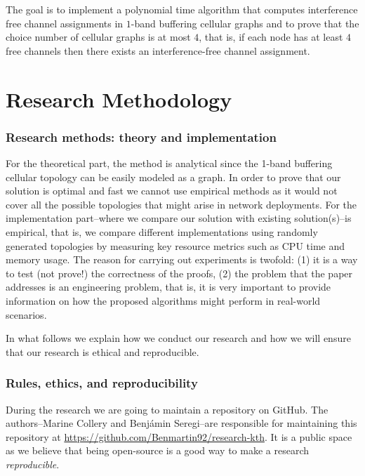 \documentclass[letterpaper, 10 pt, conference]{ieeeconf}  %
\begin{document}
The goal is to implement a polynomial time algorithm that computes interference free channel assignments in $1$-band buffering cellular graphs and to prove that the choice number of cellular graphs is at most $4$, that is, if each node has at least $4$ free channels then there exists an interference-free channel assignment.

\section{Research Methodology}
\subsubsection*{Research methods: theory and implementation}
For the theoretical part, the method is analytical since the 1-band buffering cellular topology can be easily modeled as a graph. In order
to prove that our solution is optimal and fast we cannot use empirical methods as it would not cover all the possible
topologies that might arise in network deployments. For the implementation part\---where we compare our solution with existing solution(s)\---is empirical, that is, we compare different implementations using randomly generated topologies by measuring key resource metrics such as CPU time and memory usage. The reason for carrying out experiments is twofold: (1) it is a way to test (not prove!) the correctness of the proofs, (2) the problem that the paper addresses is an engineering problem, that is, it is very important to provide information on how the proposed algorithms might perform in real-world scenarios.

In what follows we explain how we conduct our research and how we will ensure that our research is ethical and reproducible.
\subsubsection*{Rules, ethics, and reproducibility}
During the research we are going to maintain a repository on GitHub. The authors\---Marine Collery and Benjámin Seregi\---are responsible for maintaining this repository at \url{https://github.com/Benmartin92/research-kth}. It is a public space as we believe that being open-source is a good way to make a research \textit{reproducible}.
\end{document}
